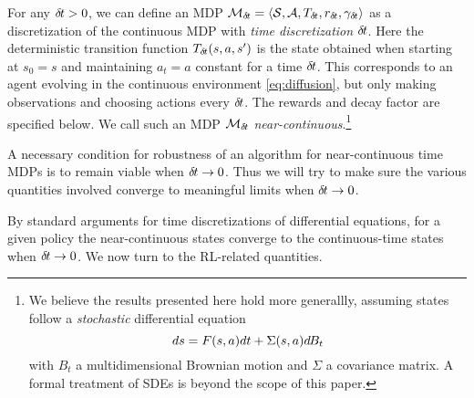 For any ${\delta\hspace{-.1em}t}>0$, we can define an MDP ${\cal
M}_{\delta\hspace{-.1em}t} = \langle {\cal S}, {\cal A}, T_{{\delta\hspace{-.1em}t}}, r_{\delta\hspace{-.1em}t},
      \gamma_{\delta\hspace{-.1em}t}\rangle$ as a discretization of the continuous MDP with
      \emph{time discretization} ${\delta\hspace{-.1em}t}$. Here the deterministic
      transition function
      $T_{\delta\hspace{-.1em}t}(s, a, s')$ is %
      the
      state obtained
      when starting at $s_0 = s$ and maintaining $a_t=a$ constant for a time
      ${\delta\hspace{-.1em}t}$.
      This corresponds to an agent evolving in the continuous
      environment \eqref{eq:diffusion}, but 
      only making observations and choosing actions every ${\delta\hspace{-.1em}t}$. The
      rewards and decay factor are specified below. We
      call such an  MDP ${\cal M}_{\delta\hspace{-.1em}t}$
      \emph{near-continuous}.\footnote{
      We believe the results presented here hold more
      generallly, assuming states
      follow a \emph{stochastic} differential equation \begin{equation}
	      ds = F(s, a)dt  + \Sigma(s, a)d\hspace{-.1em}B_t
	      \label{eq:sde}
      \end{equation} with
      $B_t$ a multidimensional Brownian motion and $\Sigma$ a covariance matrix. A
      formal treatment of SDEs is beyond the scope of this paper.}


A necessary condition for robustness of an algorithm for
near-continuous time MDPs is 
to remain viable when ${\delta\hspace{-.1em}t} \rightarrow 0$. Thus we will try to
make sure the various quantities involved converge to meaningful
limits when ${\delta\hspace{-.1em}t}\to 0$.

By standard arguments for time discretizations of differential
equations, for a given policy the near-continuous states converge to the
continuous-time states when ${\delta\hspace{-.1em}t}\to 0$.  We now turn to the RL-related quantities.

